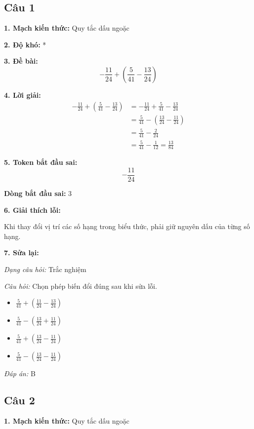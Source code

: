 \subsection*{Câu 1}

\noindent\textbf{1. Mạch kiến thức:} Quy tắc dấu ngoặc

\noindent\textbf{2. Độ khó:} *

\noindent\textbf{3. Đề bài:}
\[
-\frac{11}{24}+\left(\frac{5}{41}-\frac{13}{24}\right)
\]

\noindent\textbf{4. Lời giải:}
\begin{align*}
-\frac{11}{24}+\left(\frac{5}{41}-\frac{13}{24}\right)
    &= -\frac{11}{24}+\frac{5}{41}-\frac{13}{24} \\
    &= \frac{5}{41}-\left(\frac{13}{24}-\frac{11}{24}\right) \\
    &= \frac{5}{41}-\frac{2}{24} \\
    &= \frac{5}{41}-\frac{1}{12}=\frac{13}{84}
\end{align*}

\noindent\textbf{5. Token bắt đầu sai:}
\[
-\frac{11}{24}
\]

\noindent\textbf{Dòng bắt đầu sai:} 3

\noindent\textbf{6. Giải thích lỗi:}

Khi thay đổi vị trí các số hạng trong biểu thức, phải giữ nguyên dấu của từng số hạng.

\noindent\textbf{7. Sửa lại:}

\textit{Dạng câu hỏi:} Trắc nghiệm

\textit{Câu hỏi:} Chọn phép biến đổi đúng sau khi sửa lỗi.


 \begin{itemize}
    \item[A.] $\displaystyle \frac{5}{41}+\left(\frac{11}{24}-\frac{13}{24}\right)$
    \item[B.] $\displaystyle \frac{5}{41}-\left(\frac{13}{24}+\frac{11}{24}\right)$
    \item[C.] $\displaystyle \frac{5}{41}+\left(\frac{13}{24}-\frac{11}{24}\right)$
    \item[D.] $\displaystyle \frac{5}{41}-\left(\frac{13}{24}-\frac{11}{24}\right)$
\end{itemize}
\textit{Đáp án:} B

\subsection*{Câu 2}

\noindent\textbf{1. Mạch kiến thức:} Quy tắc dấu ngoặc

